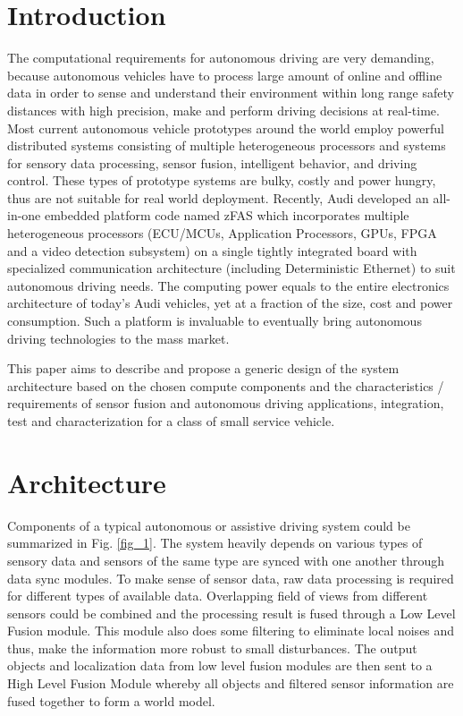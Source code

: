 \documentclass[conference]{IEEEtran}
\begin{document}
\section{Introduction}\label{introduction}

The computational requirements for autonomous driving are very
demanding, because autonomous vehicles have to process large amount of
online and offline data in order to sense and understand their
environment within long range safety distances with high precision, make
and perform driving decisions at real-time. Most current autonomous
vehicle prototypes around the world employ powerful distributed systems
consisting of multiple heterogeneous processors and systems for sensory
data processing, sensor fusion, intelligent behavior, and driving
control. These types of prototype systems are bulky, costly and power
hungry, thus are not suitable for real world deployment. Recently, Audi
developed an all-in-one embedded platform code named zFAS which
incorporates multiple heterogeneous processors (ECU/MCUs, Application
Processors, GPUs, FPGA and a video detection subsystem) on a single
tightly integrated board with specialized communication architecture
(including Deterministic Ethernet) to suit autonomous driving needs. The
computing power equals to the entire electronics architecture of today's
Audi vehicles, yet at a fraction of the size, cost and power
consumption. Such a platform is invaluable to eventually bring
autonomous driving technologies to the mass market.

This paper aims to describe and propose a generic design of the system
architecture based on the chosen compute components and the
characteristics / requirements of sensor fusion and autonomous driving
applications, integration, test and characterization for a class of
small service vehicle.

\section{Architecture}\label{architecture}

Components of a typical autonomous or assistive driving system could be
summarized in Fig. \ref{fig_1}. The system heavily depends on various
types of sensory data and sensors of the same type are synced with one
another through data sync modules. To make sense of sensor data, raw
data processing is required for different types of available data.
Overlapping field of views from different sensors could be combined and
the processing result is fused through a Low Level Fusion module. This
module also does some filtering to eliminate local noises and thus, make
the information more robust to small disturbances. The output objects
and localization data from low level fusion modules are then sent to a
High Level Fusion Module whereby all objects and filtered sensor
information are fused together to form a world model.
\end{document}
